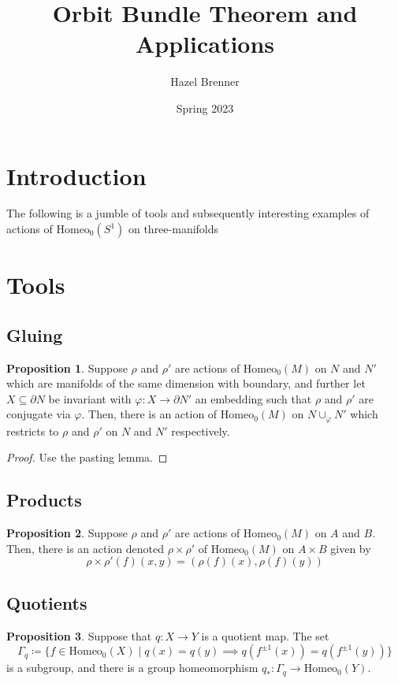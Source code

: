 \documentclass[10pt, oneside]{article}
\title{Orbit Bundle Theorem and Applications}
\author{Hazel Brenner}
\date{Spring 2023}
\newcommand{\homeo}[1][S^1]{\text{Homeo}_0(#1)}
\theoremstyle{definition}
\newtheorem{prop}{Proposition}[section]
\theoremstyle{definition}
\begin{document}
\maketitle

\section{Introduction}
The following is a jumble
of tools 
and subsequently interesting examples 
of actions of $\homeo$ 
on three-manifolds


\section{Tools}
\subsection{Gluing}
\begin{prop}
    Suppose $\rho$ and $\rho'$ are actions 
    of $\homeo[M]$ 
    on $N$ and $N'$
    which are manifolds
    of the same dimension
    with boundary,
    and further let $X\subseteq\partial N$ be invariant 
    with $\varphi: X \to \partial N'$ an embedding 
    such that $\rho$ and $\rho'$ are conjugate 
    via $\varphi$. 
    Then, 
    there is an action 
    of $\homeo[M]$ 
    on $N\cup_\varphi N'$ 
    which restricts 
    to $\rho$ and $\rho'$ 
    on $N$ and $N'$ respectively.
\end{prop}
\begin{proof}
    Use the pasting lemma.
\end{proof}


\subsection{Products}
\begin{prop}\label{product-construction}
    Suppose $\rho$ and $\rho'$ are actions 
    of $\homeo[M]$ 
    on $A$ and $B$.
    Then,
    there is an action 
    denoted $\rho\times\rho'$
    of $\homeo[M]$ 
    on $A\times B$
    given by
    $$\rho\times\rho'(f)(x,y) = (\rho(f)(x), \rho(f)(y))$$
\end{prop}


\subsection{Quotients}
\begin{prop}
    Suppose 
    that $q: X\to Y$ is
    a quotient map.
    The set
    $$\Gamma_q \coloneqq\{f\in\homeo[X]\; \vert\; q(x) = q(y) \implies q(f^{\pm 1}(x)) = q(f^{\pm 1}(y))\}$$
    is a subgroup,
    and there is a group homeomorphism
    $q_*: \Gamma_q \to \homeo[Y]$.
\end{prop}
\end{document}
